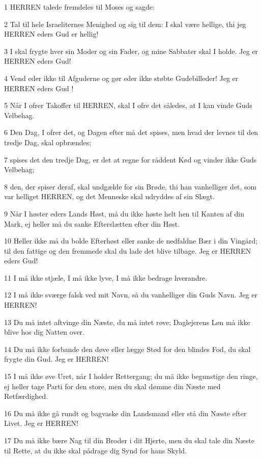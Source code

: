 \par 1 HERREN talede fremdeles til Moses og sagde:
\par 2 Tal til hele Israeliternes Menighed og sig til dem: I skal være hellige, thi jeg HERREN eders Gud er hellig!
\par 3 I skal frygte hver sin Moder og sin Fader, og mine Sabbater skal I holde. Jeg er HERREN eders Gud!
\par 4 Vend eder ikke til Afguderne og gør eder ikke støbte Gudebilleder! Jeg er HERREN eders Gud !
\par 5 Når I ofrer Takoffer til HERREN, skal I ofre det således, at I kan vinde Guds Velbehag.
\par 6 Den Dag, I ofrer det, og Dagen efter må det spises, men hvad der levnes til den tredje Dag, skal opbrændes;
\par 7 spises det den tredje Dag, er det at regne for råddent Kød og vinder ikke Guds Velbehag;
\par 8 den, der spiser deraf, skal undgælde for sin Brøde, thi han vanhelliger det, som var helliget HERREN, og det Menneske skal udryddes af sin Slægt.
\par 9 Når I høster eders Lands Høst, må du ikke høste helt hen til Kanten af din Mark, ej heller må du sanke Efterslætten efter din Høst.
\par 10 Heller ikke må du bolde Efterhøst eller sanke de nedfaldne Bær i din Vingård; til den fattige og den fremmede skal du lade det blive tilbage. Jeg er HERREN eders Gud!
\par 11 I må ikke stjæle, I må ikke lyve, I må ikke bedrage hverandre.
\par 12 I må ikke sværge falsk ved mit Navn, så du vanhelliger din Guds Navn. Jeg er HERREN!
\par 13 Du må intet aftvinge din Næste, du må intet røve; Daglejerens Løn må ikke blive hos dig Natten over.
\par 14 Du må ikke forbande den døve eller lægge Stød for den blindes Fod, du skal frygte din Gud. Jeg er HERREN!
\par 15 I må ikke øve Uret, når I holder Rettergang; du må ikke begunstige den ringe, ej heller tage Parti for den store, men du skal dømme din Næste med Retfærdighed.
\par 16 Du må ikke gå rundt og bagvaske din Landsmand eller stå din Næste efter Livet. Jeg er HERREN!
\par 17 Du må ikke bære Nag til din Broder i dit Hjerte, men du skal tale din Næste til Rette, at du ikke skal pådrage dig Synd for hans Skyld.
